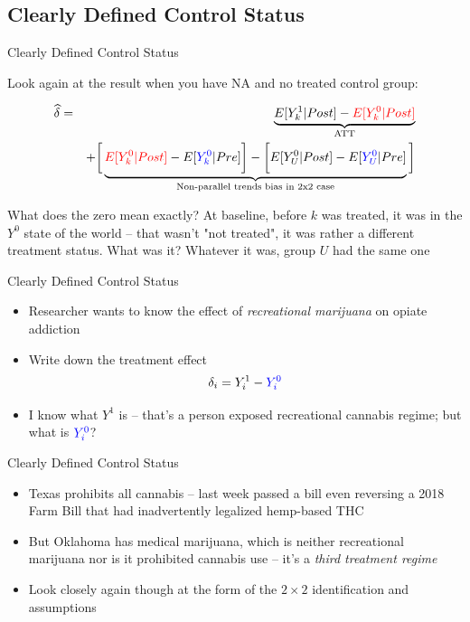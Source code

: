\documentclass{beamer}
\begin{document}
\subsection{Clearly Defined Control Status}

\begin{frame}{Clearly Defined Control Status}

Look again at the result when you have NA and no treated control group:

\begin{eqnarray*}
\widehat{\delta} &=& \underbrace{E[Y^1_k | Post] - \textcolor{red}{E[Y^0_k | Post]}}_{\mathclap{\text{ATT}}} \\
&& + \bigg [  \underbrace{\textcolor{red}{E[Y^0_k | Post]} - E[\textcolor{blue}{Y^0_k} | Pre] \bigg ] - \bigg [ E[Y^0_U | Post] - E[\textcolor{blue}{Y_U^0} | Pre] }_{\mathclap{\text{Non-parallel trends bias in 2x2 case}}} \bigg ]
\end{eqnarray*}

What does the zero mean exactly?  At baseline, before $k$ was treated, it was in the $Y^0$ state of the world -- that wasn't "not treated", it was rather a different treatment status.  What was it?  Whatever it was, group $U$ had the same one

\end{frame}

\begin{frame}{Clearly Defined Control Status}

\begin{itemize}
\item Researcher wants to know the effect of \emph{recreational marijuana} on opiate addiction
\item Write down the treatment effect $$\delta_i = Y^1_i - \textcolor{blue}{Y^0_i}$$
\item I know what $Y^1$ is -- that's a person exposed recreational cannabis regime; but what is $\textcolor{blue}{Y^0_i}$?

\end{itemize}

\end{frame}

\begin{frame}{Clearly Defined Control Status}

\begin{itemize}
\item Texas prohibits all cannabis -- last week passed a bill even reversing a 2018 Farm Bill that had inadvertently legalized hemp-based THC
\item But Oklahoma has medical marijuana, which is neither recreational marijuana nor is it prohibited cannabis use -- it's a \emph{third treatment regime}
\item Look closely again though at the form of the $2 \times 2$ identification and assumptions
\end{itemize}


\end{frame}
\end{document}
